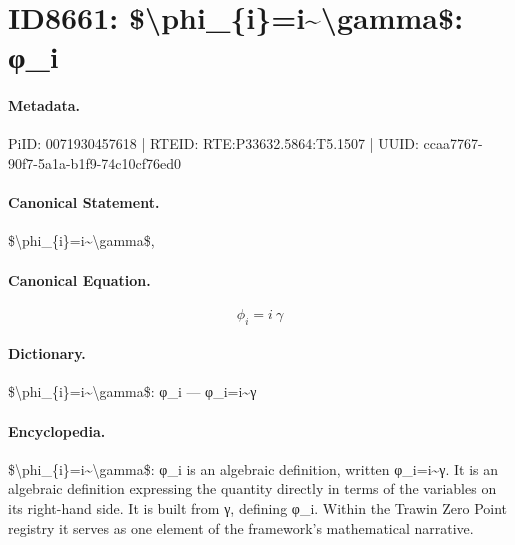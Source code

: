 \section*{ID8661: \$\textbackslash{}phi\_\{i\}=i\textasciitilde{}\textbackslash{}gamma\$: φ\_i}
\paragraph{Metadata.}
PiID: 0071930457618 | RTEID: RTE:P33632.5864:T5.1507 | UUID: ccaa7767-90f7-5a1a-b1f9-74c10cf76ed0

\paragraph{Canonical Statement.}
\$\textbackslash{}phi\_\{i\}=i\textasciitilde{}\textbackslash{}gamma\$,

\paragraph{Canonical Equation.}
\[
\phi_{i}=i~\gamma
\]

\paragraph{Dictionary.}
\$\textbackslash{}phi\_\{i\}=i\textasciitilde{}\textbackslash{}gamma\$: φ\_i — φ\_i=i\textasciitilde{}γ

\paragraph{Encyclopedia.}
\$\textbackslash{}phi\_\{i\}=i\textasciitilde{}\textbackslash{}gamma\$: φ\_i is an algebraic definition, written φ\_i=i\textasciitilde{}γ. It is an algebraic definition expressing the quantity directly in terms of the variables on its right-hand side. It is built from γ, defining φ\_i. Within the Trawin Zero Point registry it serves as one element of the framework's mathematical narrative.

